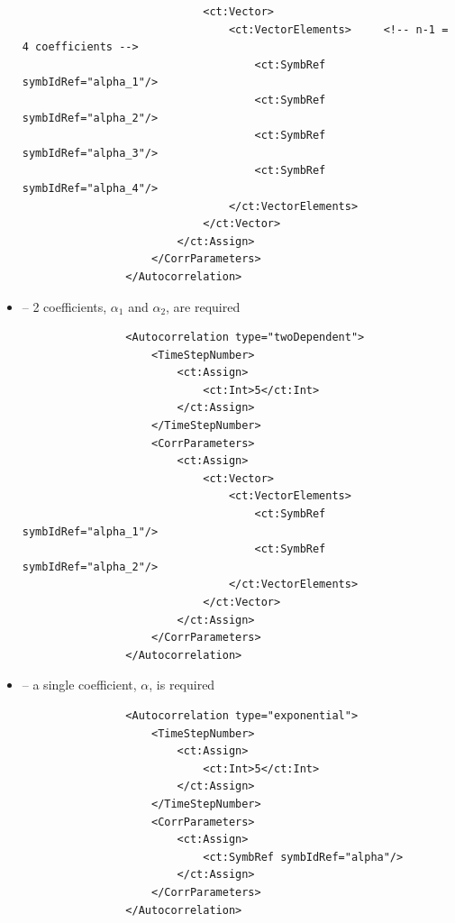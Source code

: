 \begin{itemize}
\begin{lstlisting}
                            <ct:Vector>
                                <ct:VectorElements>     <!-- n-1 = 4 coefficients -->
                                    <ct:SymbRef symbIdRef="alpha_1"/>
                                    <ct:SymbRef symbIdRef="alpha_2"/>
                                    <ct:SymbRef symbIdRef="alpha_3"/>
                                    <ct:SymbRef symbIdRef="alpha_4"/>
                                </ct:VectorElements>
                            </ct:Vector>
                        </ct:Assign>
                    </CorrParameters>
                </Autocorrelation>
\end{lstlisting}
\item 
{} -- 2 coefficients,  $\alpha_1$ and $\alpha_2$, are required
\begin{lstlisting}
                <Autocorrelation type="twoDependent">
                    <TimeStepNumber>
                        <ct:Assign>
                            <ct:Int>5</ct:Int>
                        </ct:Assign>
                    </TimeStepNumber>
                    <CorrParameters>
                        <ct:Assign>
                            <ct:Vector>
                                <ct:VectorElements>
                                    <ct:SymbRef symbIdRef="alpha_1"/>
                                    <ct:SymbRef symbIdRef="alpha_2"/>
                                </ct:VectorElements>
                            </ct:Vector>
                        </ct:Assign>
                    </CorrParameters>
                </Autocorrelation>
\end{lstlisting}
\item 
{} -- a single coefficient, $\alpha$, is required
\begin{lstlisting}
                <Autocorrelation type="exponential">
                    <TimeStepNumber>
                        <ct:Assign>
                            <ct:Int>5</ct:Int>
                        </ct:Assign>
                    </TimeStepNumber>
                    <CorrParameters>
                        <ct:Assign>
                            <ct:SymbRef symbIdRef="alpha"/>
                        </ct:Assign>
                    </CorrParameters>
                </Autocorrelation>
\end{lstlisting}
\end{itemize}

\lstset{language=XML}
\begin{lstlisting}
                                                
                
\end{lstlisting}




